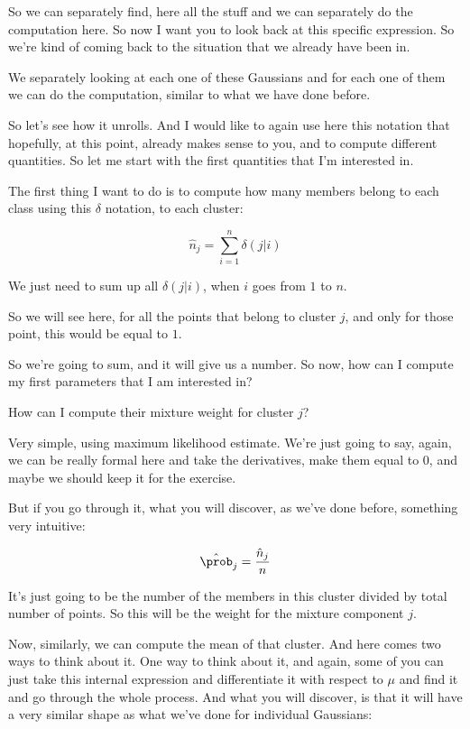 \documentclass[a4paper, 12pt]{article}
\begin{document}
So we can separately find, here all the stuff and we can separately do the
computation here. So now I want you to look back at this specific expression. So
we're kind of coming back to the situation that we already have been in.

We separately looking at each one of these Gaussians and for each one of them we
can do the computation, similar to what we have done before.

So let's see how it unrolls. And I would like to again use here this notation
that hopefully, at this point, already makes sense to you, and to compute
different quantities. So let me start with the first quantities that I'm
interested in.

The first thing I want to do is to compute how many members belong to each class
using this \(\delta\) notation, to each cluster:

\begin{equation}
\label{eq:org9f4a4f3}
\hat{n}_j = \sum_{i=1}^{n} \delta(j|i)
\end{equation}

We just need to sum up all \(\delta(j|i)\), when \(i\) goes from \(1\) to \(n\).

So we will see here, for all the points that belong to cluster \(j\), and only
for those point, this would be equal to \(1\).

So we're going to sum, and it will give us a number. So now, how can I compute
my first parameters that I am interested in?

How can I compute their mixture weight for cluster \(j\)?

Very simple, using maximum likelihood estimate. We're just going to say, again,
we can be really formal here and take the derivatives, make them equal to 0, and
maybe we should keep it for the exercise.

But if you go through it, what you will discover, as we've done before,
something very intuitive:

\begin{equation}
\label{eq:org7de31fb}
\hat{\prob}_j = \frac{\hat{n}_j}{n}
\end{equation}

It's just going to be the number of the members in this cluster divided by total
number of points. So this will be the weight for the mixture component \(j\).

Now, similarly, we can compute the mean of that cluster. And here comes two ways
to think about it. One way to think about it, and again, some of you can just
take this internal expression and differentiate it with respect to \(\mu\) and
find it and go through the whole process. And what you will discover, is that it
will have a very similar shape as what we've done for individual Gaussians:
\end{document}
